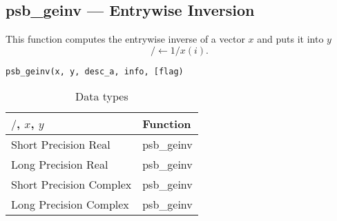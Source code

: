 \clearpage\subsection*{psb\_geinv --- Entrywise Inversion}

This function computes the entrywise inverse of a vector $x$ and puts it into
$y$
\[/ \leftarrow 1/x(i).\]

\begin{verbatim}
psb_geinv(x, y, desc_a, info, [flag)
\end{verbatim}
\begin{table}[h]
	\begin{center}
		\begin{tabular}{ll}
			\hline
			$/$, $x$, $y$ & {\bf Function}\\
			\hline
			Short Precision Real & psb\_geinv \\
			Long Precision Real & psb\_geinv \\
			Short Precision Complex & psb\_geinv \\	
			Long Precision Complex & psb\_geinv \\	
			\hline
		\end{tabular}
	\end{center}
	\caption{Data types\label{tab:f90inv}}
\end{table}

